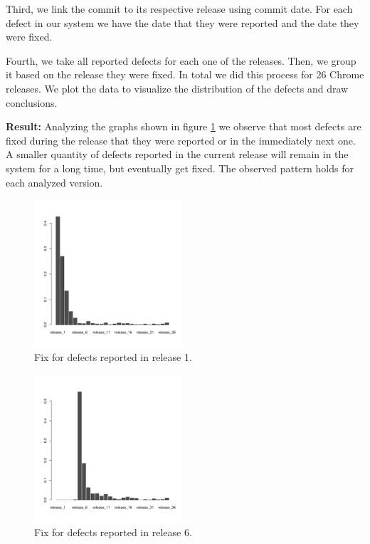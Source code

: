 Third, we link the commit to its respective release using commit date. For each defect in our system we have the date that they were reported and the date they were fixed. 

Fourth, we take all reported defects for each one of the releases. Then, we group it based on the release they were fixed. In total we did this process for 26 Chrome releases. We plot the data to visualize the distribution of the defects and draw conclusions. 

\vspace{1mm}
\noindent\textbf{Result:} Analyzing the graphs shown in figure \ref{fig:defect_release_1} we observe that most defects are fixed during the release that they were reported or in the immediately next one. A smaller quantity of defects reported in the current release will remain in the system for a long time, but eventually get fixed. The observed pattern holds for each analyzed version. 

\begin{figure}[thb!]
	\caption{Fix for defects reported in release 1.}
	\label{fig:defect_release_1}
	\includegraphics[width=0.49\textwidth]{figures/r1}
\end{figure}

\begin{figure}[thb!]
	\caption{Fix for defects reported in release 6.}
	\label{fig:defect_release_6}
	\includegraphics[width=0.49\textwidth]{figures/r6}
\end{figure}

